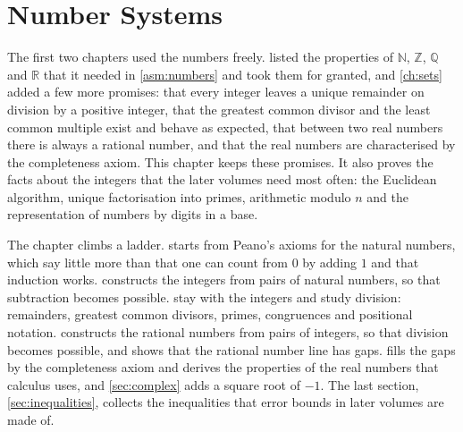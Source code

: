 \chapter{Number Systems}
\label{ch:numbers}


The first two chapters used the numbers freely.  listed the properties of $\mathbb N$, $\mathbb Z$, $\mathbb Q$ and $\mathbb R$ that it needed in \cref{asm:numbers} and took them for granted, and \cref{ch:sets} added a few more promises: that every integer leaves a unique remainder on division by a positive integer, that the greatest common divisor and the least common multiple exist and behave as expected, that between two real numbers there is always a rational number, and that the real numbers are characterised by the completeness axiom. This chapter keeps these promises. It also proves the facts about the integers that the later volumes need most often: the Euclidean algorithm, unique factorisation into primes, arithmetic modulo $n$ and the representation of numbers by digits in a base.

The chapter climbs a ladder.  starts from Peano's axioms for the natural numbers, which say little more than that one can count from $0$ by adding $1$ and that induction works.  constructs the integers from pairs of natural numbers, so that subtraction becomes possible.  stay with the integers and study division: remainders, greatest common divisors, primes, congruences and positional notation.  constructs the rational numbers from pairs of integers, so that division becomes possible, and shows that the rational number line has gaps.  fills the gaps by the completeness axiom and derives the properties of the real numbers that calculus uses, and \cref{sec:complex} adds a square root of $-1$. The last section, \cref{sec:inequalities}, collects the inequalities that error bounds in later volumes are made of.


